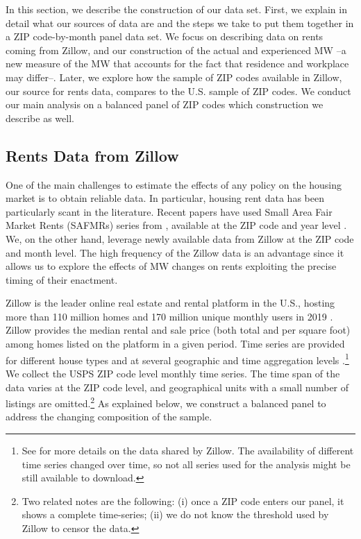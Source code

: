 
In this section, we describe the construction of our data set. First, we explain in detail
what our sources of data are and the steps we take to put them together in a ZIP code-by-month
panel data set. We focus on describing data on rents coming from Zillow, and our
construction of the actual and experienced MW --a new measure of the MW that accounts
for the fact that residence and workplace may differ--. Later, we explore how the 
sample of ZIP codes available in Zillow, our source for rents data, compares to the 
U.S. sample of ZIP codes. We conduct our main analysis on a balanced panel of ZIP codes 
which construction we describe as well.

\subsection{Rents Data from Zillow}

One of the main challenges to estimate the effects of any policy on the housing market
is to obtain reliable data. In particular, housing rent data has been particularly scant
in the literature. Recent papers have used Small Area Fair Market Rents (SAFMRs) series 
from \textcite{hud}, available at the ZIP code and year level \parencite{Tidemann2018, 
Yamagishi2019}. We, on the other hand, leverage newly available data from Zillow at the 
ZIP code and month level. The high frequency of the Zillow data is an advantage since it 
allows us to explore the effects of MW changes on rents exploiting the precise timing of 
their enactment.

Zillow is the leader online real estate and rental platform in the U.S., hosting more 
than 110 million homes and 170 million unique monthly users in 2019 
\parencite{ZillowFacts}. Zillow provides the median rental and sale price (both 
total and per square foot) among homes listed on the platform in a given period. Time 
series are provided for different house types and at several geographic and time 
aggregation levels \parencite{ZillowData}.\footnote{See \textcite{ZillowData} for 
	more details on the data shared by Zillow. The availability of different time 
	series changed over time, so not all series used for the analysis might be still 
	available to download.} 
We collect the USPS ZIP code level monthly time series. The time span of the data 
varies at the ZIP code level, and geographical units with a small number of listings
are omitted.\footnote{Two related notes are the following: (i) once a ZIP code 
enters our panel, it shows a complete time-series; (ii) we do not know the threshold
used by Zillow to censor the data.} 
As explained below, we construct a balanced panel to address the changing composition 
of the sample.

